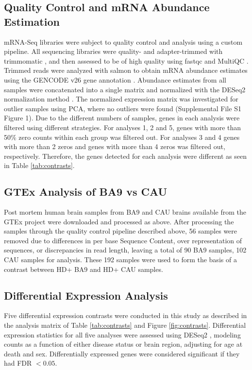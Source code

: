 \documentclass[fleqn,10pt,table]{wlscirep}
\begin{document}
\subsection{Quality Control and mRNA Abundance Estimation}
mRNA-Seq libraries were subject to quality control and analysis using a custom pipeline.
All sequencing libraries were quality- and adapter-trimmed with trimmomatic \cite{Bolger2014-fp}, and then assessed to be of high quality using fastqc \cite{fastqc} and MultiQC \cite{Ewels2016-qh}.
Trimmed reads were analyzed with salmon \cite{Patro2015-jg} to obtain mRNA abundance estimates using the GENCODE v26 gene annotation \cite{Harrow2012-fr}.
Abundance estimates from all samples were concatenated into a single matrix and normalized with the DESeq2 normalization method \cite{Love2014-nu}.
The normalized expression matrix was investigated for outlier samples using PCA, where no outliers were found (Supplemental File S1 Figure 1).
Due to the different numbers of samples, genes in each analysis were filtered using different strategies.
For analyses 1, 2 and 5, genes with more than 50\% zero counts within each group was filtered out.
For analyses 3 and 4 genes with more than 2 zeros and genes with more than 4 zeros was filtered out, respectively.
Therefore, the genes detected for each analysis were different as seen in Table \ref{tab:contrasts}.

\subsection{GTEx Analysis of BA9 vs CAU}
Post mortem human brain samples from BA9 and CAU brains available from the GTEx project \cite{Carithers2015-vh} were downloaded and processed as above.
After processing the samples through the quality control pipeline described above, 56 samples were removed due to differences in per base Sequence Content, over representation of sequences, or discrepancies in read length, leaving a total of 90 BA9 samples, 102 CAU samples for analysis.
These 192 samples were used to form the basis of a contrast between HD+ BA9 and HD+ CAU samples.

\subsection{Differential Expression Analysis}
Five differential expression contrasts were conducted in this study as described in the analysis matrix of Table \ref{tab:contrasts} and Figure \ref{fig:contrasts}.
Differential expression statistics for all five analyses were assessed using DESeq2 \cite{Love2014-nu}, modeling counts as a function of either disease status or brain region, adjusting for age at death and sex.
Differentially expressed genes were considered significant if they had FDR $< 0.05$.
\end{document}
